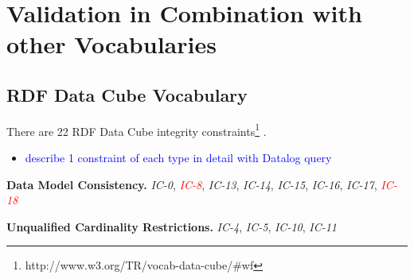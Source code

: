 \documentclass{llncs}
\begin{document}
{\section{Validation in Combination with other Vocabularies}

\subsection{RDF Data Cube Vocabulary}

There are 22 RDF Data Cube integrity constraints\footnote{http://www.w3.org/TR/vocab-data-cube/\#wf} \cite{CyganiakReynolds2014}.

\begin{itemize}
	\item \textcolor{blue}{describe 1 constraint of each type in detail with Datalog query}
\end{itemize}

\textbf{Data Model Consistency.}
{\em IC-0}, \textcolor{red}{{\em IC-8}}, {\em IC-13}, {\em IC-14}, {\em IC-15}, {\em IC-16}, {\em IC-17}, \textcolor{red}{{\em IC-18}}

\textbf{Unqualified Cardinality Restrictions.}
{\em IC-4}, {\em IC-5}, {\em IC-10}, {\em IC-11}

}
\end{document}
